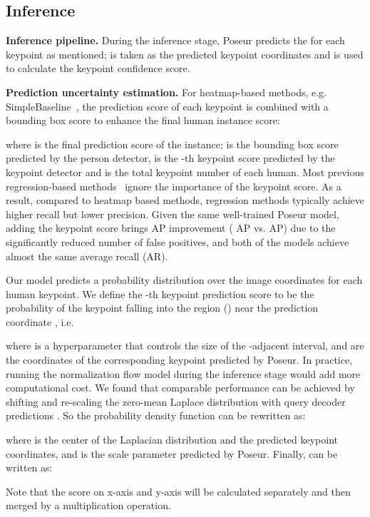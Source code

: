 \documentclass[runningheads]{llncs}
\def\ie{{i.e.\xspace}}
\def\handle{{Poseur}\xspace}
\begin{document}
\subsection{Inference}\label{sec:score}
\noindent\textbf{Inference pipeline.} 
During the inference stage, \handle predicts the  for each keypoint as mentioned;  is taken as the predicted keypoint coordinates and  is used to calculate the keypoint confidence score.

\noindent\textbf{Prediction uncertainty estimation.} 
For heatmap-based methods,  e.g.  SimpleBaseline~\cite{xiao2018simple}, the prediction score of each keypoint is combined with a bounding box score to enhance the final human instance score:

where  is the final prediction score of the instance;  is the bounding box score predicted by the person detector,  is the -th keypoint score predicted by the keypoint detector and  is the total keypoint number of each human. 
Most previous regression-based methods~\cite{2014deeppose,sun2018integral} ignore the importance of the keypoint score.
As a result, compared to heatmap based methods, regression methods typically achieve higher recall but lower precision.
Given the same well-trained \handle model, adding the keypoint score brings  AP improvement ( AP vs.  AP) due to the significantly reduced number of false positives, and both of the models achieve almost the same average recall (AR).


Our model predicts a probability distribution over the image coordinates for each human keypoint. 
We define the -th keypoint prediction score  to be the probability of the keypoint falling into the region () near the prediction coordinate , \ie

where  is a hyperparameter that controls the size of the -adjacent interval, and  are the coordinates of the corresponding keypoint predicted by \handle.
In practice, running the normalization flow model during the inference stage would add more computational cost. We found that comparable performance can be achieved by shifting and re-scaling the zero-mean Laplace distribution  with query decoder predictions . So the probability density function can be rewritten as:

where  is the center of the Laplacian distribution and the predicted keypoint coordinates, and  is the scale parameter predicted by \handle. Finally,  can be written as:

Note that the score  on x-axis and y-axis will be calculated separately and then merged by a multiplication operation.
\end{document}
